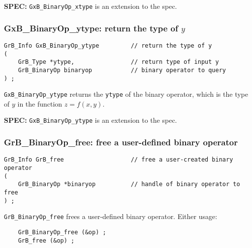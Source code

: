 \documentclass[12pt]{article}
\begin{document}
\begin{spec}
{\bf SPEC:} \verb'GxB_BinaryOp_xtype' is an extension to the spec.
\end{spec}

\subsubsection{{\sf GxB\_BinaryOp\_ytype:} return the type of $y$}
\label{binaryop_ytype}

\begin{mdframed}[userdefinedwidth=6in]
{\footnotesize
\begin{verbatim}
GrB_Info GxB_BinaryOp_ytype         // return the type of y
(
    GrB_Type *ytype,                // return type of input y
    GrB_BinaryOp binaryop           // binary operator to query
) ;
\end{verbatim}
} \end{mdframed}

\verb'GxB_BinaryOp_ytype'
returns the \verb'ytype' of the binary operator, which is the
type of $y$ in the function $z=f(x,y)$.

\begin{spec}
{\bf SPEC:} \verb'GxB_BinaryOp_ytype' is an extension to the spec.
\end{spec}

\subsubsection{{\sf GrB\_BinaryOp\_free:} free a user-defined binary operator}
\label{binaryop_free}

\begin{mdframed}[userdefinedwidth=6in]
{\footnotesize
\begin{verbatim}
GrB_Info GrB_free                   // free a user-created binary operator
(
    GrB_BinaryOp *binaryop          // handle of binary operator to free
) ;
\end{verbatim}
} \end{mdframed}

\verb'GrB_BinaryOp_free' frees a user-defined binary operator.
Either usage:

    {\small
    \begin{verbatim}
    GrB_BinaryOp_free (&op) ;
    GrB_free (&op) ; \end{verbatim}}
\end{document}
